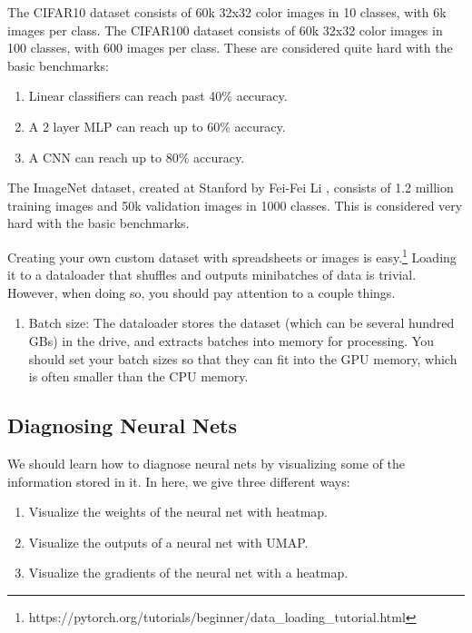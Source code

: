 \documentclass{article}
\begin{document}
    \begin{definition}
      The CIFAR10 dataset consists of 60k 32x32 color images in 10 classes, with 6k images per class. The CIFAR100 dataset consists of 60k 32x32 color images in 100 classes, with 600 images per class. These are considered quite hard with the basic benchmarks: 
      \begin{enumerate} 
        \item Linear classifiers can reach past 40\% accuracy. 
        \item A 2 layer MLP can reach up to 60\% accuracy. 
        \item A CNN can reach up to 80\% accuracy. 
      \end{enumerate}
    \end{definition}

    \begin{definition}[ImageNet]
      The ImageNet dataset, created at Stanford by Fei-Fei Li \cite{ImageNet}, consists of 1.2 million training images and 50k validation images in 1000 classes. This is considered very hard with the basic benchmarks. 
    \end{definition}

    Creating your own custom dataset with spreadsheets or images is easy.\footnote{https://pytorch.org/tutorials/beginner/data\_loading\_tutorial.html} Loading it to a dataloader that shuffles and outputs minibatches of data is trivial. However, when doing so, you should pay attention to a couple things. 
    \begin{enumerate} 
      \item Batch size: The dataloader stores the dataset (which can be several hundred GBs) in the drive, and extracts batches into memory for processing. You should set your batch sizes so that they can fit into the GPU memory, which is often smaller than the CPU memory. 
    \end{enumerate}

  \subsection{Diagnosing Neural Nets}
    
    We should learn how to diagnose neural nets by visualizing some of the information stored in it. In here, we give three different ways: 

    \begin{enumerate} 
      \item Visualize the weights of the neural net with heatmap. 
      \item Visualize the outputs of a neural net with UMAP. 
      \item Visualize the gradients of the neural net with a heatmap. 
    \end{enumerate}
\end{document}
